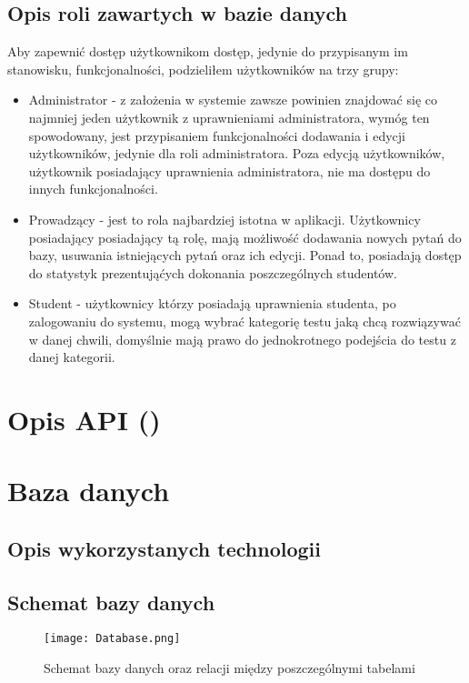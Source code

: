 \documentclass[a4paper, titlepage]{article}
\begin{document}
				\subsection{Opis roli zawartych w bazie danych}
				Aby zapewnić dostęp użytkownikom dostęp, jedynie do przypisanym im stanowisku, funkcjonalności, podzieliłem użytkowników na trzy grupy:
	\begin{itemize}
	\item Administrator - z założenia w systemie zawsze powinien znajdować się co najmniej jeden użytkownik z uprawnieniami administratora, wymóg ten spowodowany, jest przypisaniem funkcjonalności dodawania i edycji użytkowników, jedynie dla roli administratora. Poza edycją użytkowników, użytkownik posiadający uprawnienia administratora, nie ma dostępu do innych funkcjonalności.
	\item Prowadzący - jest to rola najbardziej istotna w aplikacji. Użytkownicy posiadający posiadający tą rolę, mają możliwość dodawania nowych pytań do bazy, usuwania istniejących pytań oraz ich edycji. Ponad to, posiadają dostęp do statystyk prezentująćych dokonania poszczególnych studentów. 
	\item Student - użytkownicy którzy posiadają uprawnienia studenta, po zalogowaniu do systemu, mogą wybrać kategorię testu jaką chcą rozwiązywać w danej chwili, domyślnie mają prawo do jednokrotnego podejścia do testu z danej kategorii.
    \end{itemize}

				\section{Opis API ()}				

				\section{Baza danych}
				\subsection{Opis wykorzystanych technologii}
				\subsection{Schemat bazy danych}
                \begin{figure}[H]
      \centering
      \texttt{[image: Database.png]}
      \caption{Schemat bazy danych oraz relacji między poszczególnymi tabelami}
  \end{figure}
\end{document}
